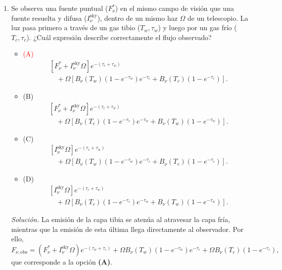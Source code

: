 \documentclass[11pt]{article}
\begin{document}
\begin{enumerate}
    \item Se observa una fuente puntual ($F^*_\nu$) en el mismo campo de visión que una fuente resuelta y difusa ($I^{\mathrm{sky}}_\nu$), dentro de un mismo haz $\Omega$ de un telescopio. La luz pasa primero a través de un gas tibio ($T_w,\tau_w$) y luego por un gas frío ($T_c,\tau_c$). ¿Cuál expresión describe correctamente el flujo observado?
    \begin{itemize}
        \item \textcolor{red}{(A)}
        {\color{red}
        \[
        \begin{aligned}
        &[F^*_\nu+I^{\mathrm{sky}}_\nu\Omega]e^{-(\tau_c+\tau_w)}\\
        &\quad+\Omega\left[B_\nu(T_w)(1-e^{-\tau_w})e^{-\tau_c}
        +B_\nu(T_c)(1-e^{-\tau_c})\right].
        \end{aligned}
        \]}
        \item (B)
        \[
        \begin{aligned}
        &[F^*_\nu+I^{\mathrm{sky}}_\nu\Omega]e^{-(\tau_c+\tau_w)}\\
        &\quad+\Omega\left[B_\nu(T_c)(1-e^{-\tau_c})e^{-\tau_w}
        +B_\nu(T_w)(1-e^{-\tau_w})\right].
        \end{aligned}
        \]
        \item (C)
        \[
        \begin{aligned}
        &[I^{\mathrm{sky}}_\nu\Omega]e^{-(\tau_c+\tau_w)}\\
        &\quad+\Omega\left[B_\nu(T_w)(1-e^{-\tau_w})e^{-\tau_c}
        +B_\nu(T_c)(1-e^{-\tau_c})\right].
        \end{aligned}
        \]
        \item (D)
        \[
        \begin{aligned}
        &[I^{\mathrm{sky}}_\nu\Omega]e^{-(\tau_c+\tau_w)}\\
        &\quad+\Omega\left[B_\nu(T_c)(1-e^{-\tau_c})e^{-\tau_w}
        +B_\nu(T_w)(1-e^{-\tau_w})\right].
        \end{aligned}
        \]
        \end{itemize}
    \textit{Solución.} La emisión de la capa tibia se atenúa al atravesar la capa fría, mientras que la emisión de esta última llega directamente al observador. Por ello,
    \[
        F_{\nu,\mathrm{obs}}=(F^*_\nu+I^{\mathrm{sky}}_\nu\Omega)e^{-(\tau_w+\tau_c)}
        +\Omega B_\nu(T_w)(1-e^{-\tau_w})e^{-\tau_c}
        +\Omega B_\nu(T_c)(1-e^{-\tau_c}),
    \]
    que corresponde a la opción \textbf{(A)}. \parencite[Secs. 13.6--13.7, pp. 400--405]{chaparro2026}

\end{enumerate}
\end{document}
